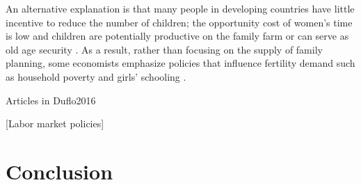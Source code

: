 \documentclass[letterpaper,12pt]{article}
\begin{document}
\citet{Rosenzweig2009} 


An alternative explanation is that many people in developing countries 
have little incentive to reduce the number of children;
the opportunity cost of women's time is low and children are potentially 
productive on the family farm or can serve as old age security
\citep{Banerjee2014,Lambert2016}.
As a result, rather than focusing on the supply of family planning, 
some economists emphasize policies that influence fertility demand 
such as household poverty and girls' schooling 
\citep{pritchett94a,DasGupta2011}.

Articles in Duflo2016

\citet{Ainsworth1996}

[Labor market policies]


\section{Conclusion}




\end{document}
